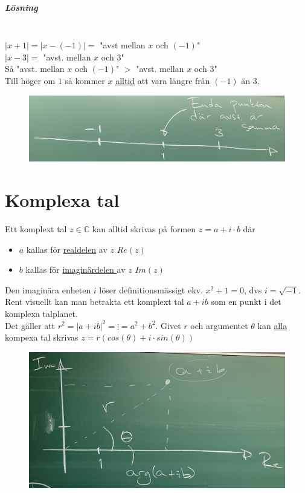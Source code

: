 \paragraph{Lösning}~\\
$|x+1| = |x-(-1)|=$ "avst mellan $x$ och $(-1)$"\\
$|x-3|=$ "avst. mellan $x$ och $3$"\\
Så "avst. mellan $x$ och $(-1)$" $ > $ "avst. mellan $x$ och $3$"\\
Till höger om $1$ så kommer $x$ \underline{alltid} att vara längre från $(-1)$ än $3$.
\begin{figure}[h!]
    \centering
    \includegraphics[scale=0.08]{lessons/lesson01/imgs/img05.jpg}
\end{figure}

\chapter{Komplexa tal}
Ett komplext tal $z\in\mathbb{C}$ kan alltid skrivas på formen $z=a+i\cdot b$ där\\
\begin{itemize}
    \item $a$ kallas för \underline{realdelen} av $z$ $Re(z)$
    \item $b$ kallas för \underline{imaginärdelen }av $z$ $Im(z)$
\end{itemize}

Den imaginära enheten $i$ löser definitionsmässigt ekv. $x^2+1=0$, dvs $i=\sqrt{-1}$.
Rent visuellt kan man betrakta ett komplext tal $a + ib$ som en punkt i det komplexa talplanet.\\
Det gäller att $r^2= |a+ib|^2= \vdots =a^2+b^2$.
Givet $r$ och argumentet $\theta$ kan \underline{alla} kompexa tal skrivas $z=r(cos(\theta)+i\cdot sin(\theta))$
\begin{figure}[h!]
    \centering
    \includegraphics[scale=0.08]{lessons/lesson01/imgs/img06.jpg}
\end{figure}